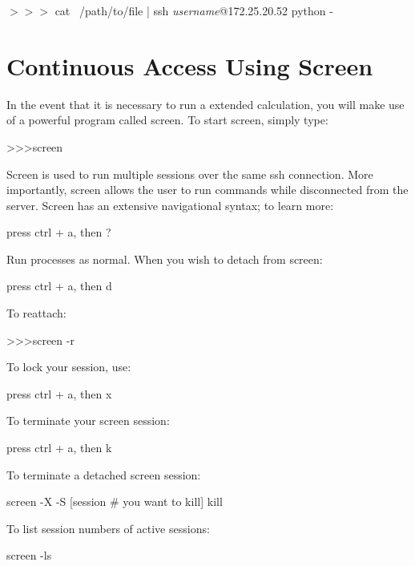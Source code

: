 \begin{mdframed}
$>>>$ \quad cat ~/path/to/file | ssh \textit{username}@172.25.20.52 python -
\end{mdframed}

\section{Continuous Access Using Screen}
In the event that it is necessary to run a extended calculation, you will make use of a powerful program called screen. To start screen, simply type:

\begin{mdframed}
\textgreater\textgreater\textgreater \quad screen
\end{mdframed}

Screen is used to run multiple sessions over the same ssh connection. More importantly, screen allows the user to run commands while disconnected from the server. Screen has an extensive navigational syntax; to learn more:

\begin{mdframed}
press ctrl + a, then ?
\end{mdframed}

Run processes as normal. When you wish to detach from screen:

\begin{mdframed}
press ctrl + a, then d
\end{mdframed}

To reattach:

\begin{mdframed}
\textgreater\textgreater\textgreater \quad screen -r
\end{mdframed}

To lock your session, use:

\begin{mdframed}
press ctrl + a, then x
\end{mdframed}

To terminate your screen session:
\begin{mdframed}
press ctrl + a, then k
\end{mdframed}

To terminate a detached screen session:
\begin{mdframed}
screen -X -S [session \# you want to kill] kill
\end{mdframed}

To list session numbers of active sessions:
\begin{mdframed}
screen -ls
\end{mdframed}


